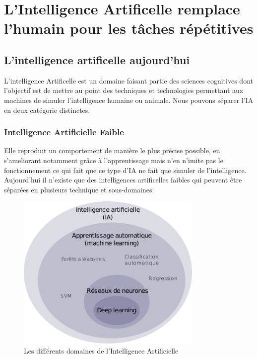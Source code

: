 \part{L'Intelligence Artificelle remplace l'humain pour les tâches répétitives}
\chapter{L'intelligence artificelle aujourd'hui}
L'intelligence Artificelle est un domaine faisant partie 
des sciences cognitives dont l'objectif est de mettre au
point des techniques et technologies permettant aux 
machines de simuler l'intelligence humaine ou animale.
Nous pouvons séparer l'IA en deux catégorie distinctes. 

\section{Intelligence Artificielle Faible}
Elle reproduit un comportement de manière le plus précise possible,
en s'ameliorant notamment grâce à l'apprentissage 
mais n'en n'imite pas le fonctionnement ce qui fait que
ce type d'IA ne fait que simuler de l'intelligence. \newline
Aujourd'hui il n'existe que des intelligences artificelles faibles qui peuvent  
être séparées en plusieurs technique et sous-domaines: \newline

\begin{figure}[!h]
    \centering
    \includegraphics[width=0.8\textwidth]{Images/aitype}
    \caption{Les différents domaines de l'Intelligence Artificielle}
	\label{fig:DiffDomaineIA}
\end{figure}
\newpage


